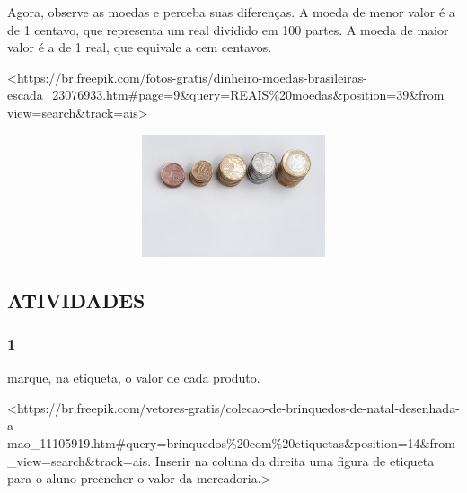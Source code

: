 
Agora, observe as moedas e perceba suas diferenças. A moeda de menor valor é a de 1 centavo, que representa um real dividido em 100 partes. A moeda de maior valor é a de 1 real, que equivale a cem centavos.

\textless{}https://br.freepik.com/fotos-gratis/dinheiro-moedas-brasileiras-escada\_23076933.htm\#page=9\&query=REAIS\%20moedas\&position=39\&from\_view=search\&track=ais\textgreater{}

\includegraphics[width=5.90556in,height=1.41667in]{media/image54.jpg}\protect\hypertarget{_heading=h.eii4svey01jf}{}{}

\subsection{ATIVIDADES}\label{atividades-4}

\subsubsection{1}\label{section-54}

marque, na etiqueta, o valor de cada produto.

\textless{}https://br.freepik.com/vetores-gratis/colecao-de-brinquedos-de-natal-desenhada-a-mao\_11105919.htm\#query=brinquedos\%20com\%20etiquetas\&position=14\&from\_view=search\&track=ais.
Inserir na coluna da direita uma figura de etiqueta para o aluno
preencher o valor da mercadoria.\textgreater{}

